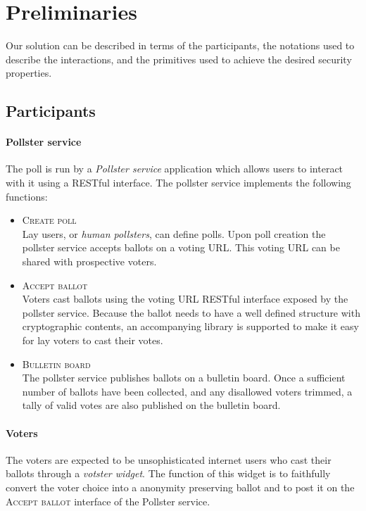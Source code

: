 

\section{Preliminaries}

Our solution can be described in terms of the participants,
the  notations used to describe the interactions,
and 
the primitives used to achieve the desired security
properties.

\subsection{Participants}
\paragraph{Pollster service}
The poll is run by a \emph{Pollster service} application which
allows users to interact with it using a RESTful
interface.  The pollster service implements the following functions:
 
\begin{itemize}
\item{ \textsc{Create poll\\}
  Lay users, or \emph{human pollsters}, can define polls.
  Upon poll creation the pollster service accepts ballots
  on a voting URL.  This voting URL can be shared with prospective voters.
}
\item{ \textsc{Accept ballot\\}
  Voters cast ballots using the voting URL RESTful interface exposed
  by the pollster service. Because the ballot needs to have
  a well defined structure with cryptographic contents, an
  accompanying library is supported to make it easy for lay voters to
  cast their votes.
}
\item{ \textsc{Bulletin board\\}
  The pollster service publishes ballots on a bulletin
  board.
  Once a sufficient number of ballots have been collected,
  and any disallowed voters trimmed, 
  a tally of valid votes are also published on the bulletin board.
}
\end{itemize}

\paragraph{Voters}
The voters are expected to be unsophisticated internet users who
cast their ballots through a \emph{votster widget}.  The function of this
widget is to faithfully convert the voter choice into a anonymity
preserving ballot and to post it on the \textsc{Accept ballot} interface
of the Pollster service.

